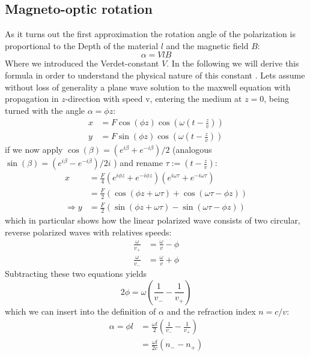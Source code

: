 \subsection{Magneto-optic rotation}
As it turns out the first approximation the rotation angle of the polarization is proportional
to the Depth of the material $l$ and the magnetic field $B$:
\begin{equation}
    \alpha = V l B
\end{equation}
Where we introduced the Verdet-constant $V$. In the following we will derive this formula in order
to understand the physical nature of this constant \cite{staatsexamen}.
Lets assume without loss of generality a plane wave solution to the maxwell equation
with propagation in $z$-direction with speed v, 
entering the medium at $z=0$, being turned with the angle
$\alpha = \phi  z$:
\begin{align}
x &= F \cos{(\phi z)} \cos{\left ( \omega \left ( t - \frac{z}{v} \right )\right)} \\ 
y &= F \sin{(\phi z)} \cos{\left ( \omega \left ( t - \frac{z}{v} \right )\right)}
\end{align}
if we now apply $\cos(\beta) = (e^{i\beta} + e^{-i\beta})/2$ 
(analogous $\sin(\beta) = (e^{i\beta} - e^{-i\beta})/2i$ )
and rename $\tau := (t-\frac{z}{v})$:
\begin{align}
x &= \frac{F}{4} \left (e ^{i\phi z} + e ^{-i\phi z} \right )
\left (e ^{i\omega \tau} + e ^{-i\omega \tau} \right ) \\ 
&= \frac{F}{2} \left ( \cos{(\phi z + \omega \tau)} + \cos{(\omega \tau -  \phi z )} \right ) \\
\Rightarrow y &= \frac{F}{2} \left ( \sin{(\phi z + \omega \tau)} - \sin{(\omega \tau -  \phi z )} \right )
\end{align}
which in particular shows how the linear polarized wave consists of two circular, reverse polarized
waves with relatives speeds:
\begin{align}
\frac{\omega}{v_+} &= \frac{\omega}{v} - \phi \label{eq:v+}\\ 
\frac{\omega}{v_-} &= \frac{\omega}{v} + \phi \label{eq:v-}
\end{align}
Subtracting these two equations yields
\begin{equation}
2\phi = \omega \left (\frac{1}{v_-} - \frac{1}{v_+} \right)
\end{equation}
which we can insert into the definition of $\alpha$ and the refraction index $n = c/v$:
\begin{align}
\alpha = \phi l &= \frac{\omega l}{2} \left (\frac{1}{v_-} - \frac{1}{v_+} \right) \\ 
 &= \frac{\omega l}{2c} \left (n_- - n_+ \right)
\end{align}

